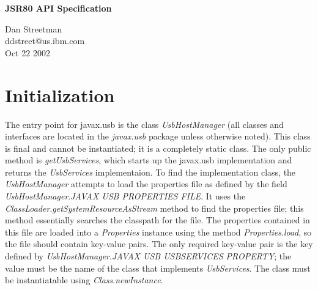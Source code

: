 \documentclass{article}
\newcommand{\mytitle}[0]{JSR80 API Specification}
\newcommand{\myauthor}[0]{Dan Streetman}
\newcommand{\mydate}[0]{Oct 22 2002}
\newcommand{\myclass}[1]{\emph{#1}}
\newcommand{\myinterface}[1]{\emph{#1}}
\newcommand{\mypackage}[1]{\emph{#1}}
\newcommand{\mymethod}[1]{\emph{#1}}
\newcommand{\myfield}[1]{\emph{#1}}
\begin{document}
\pagestyle{empty}

%

\begin{titlepage}

\begin{center}
\Huge{\textbf{\mytitle}}
\end{center}

\vfill
\vfill

\begin{flushright}
\large{\myauthor}
\\
\large{ddstreet@us.ibm.com}
\\
\large{\mydate}
\end{flushright}

\vfill

\end{titlepage}

\newpage


%

\pagestyle{fancy}
\fancyhf{}
\renewcommand{\sectionmark}[1]{\markright{\emph{\mytitle}}}
\renewcommand{\subsectionmark}[1]{\markright{\emph{\mytitle}}}
\renewcommand{\subsubsectionmark}[1]{\markright{\emph{\mytitle}}}
\fancyhead[LE,RO]{\bfseries\thepage}
\fancyhead[LO]{\rightmark}


%

\tableofcontents

\listoftables

\listoffigures

\newpage

%

\section{Initialization}

The entry point for javax.usb is the class \myclass{UsbHostManager} (all classes and interfaces
are located in the \mypackage{javax.usb} package unless otherwise noted).  This class
is final and cannot be instantiated; it is a completely static class.  The only
public method is \mymethod{getUsbServices}, which starts up the javax.usb implementation
and returns the \myinterface{UsbServices} implementaion.  To find the implementation class,
the \myclass{UsbHostManager} attempts to load the properties file as defined by the
field \myclass{UsbHostManager}.\myfield{JAVAX USB PROPERTIES FILE}.  It uses the
\myclass{ClassLoader}.\mymethod{getSystemResourceAsStream} method to find the properties file;
this method essentially searches the classpath for the file.  The properties contained
in this file are loaded into a \myclass{Properties} instance using the method
\myclass{Properties}.\mymethod{load}, so the file should contain key-value pairs.  The
only required key-value pair is the key defined by
\myclass{UsbHostManager}.\myfield{JAVAX USB USBSERVICES PROPERTY}; the value must be the
name of the class that implements \myinterface{UsbServices}.  The class must be instantiatable
using \myclass{Class}.\mymethod{newInstance}.
\end{document}
